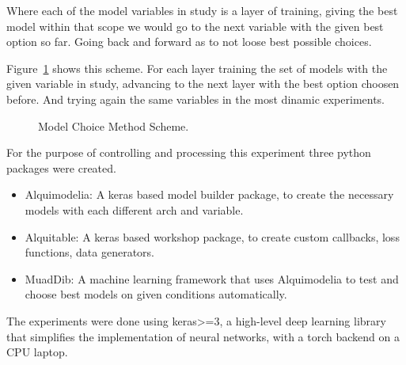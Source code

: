 Where each of the model variables in study is a layer of training, giving the best model within that scope we would go to the next variable with the given best option so far. Going back and forward as to not loose best possible choices.\par
Figure~\ref{fig:method_training} shows this scheme. For each layer training the set of models with the given variable in study, advancing to the next layer with the best option choosen before. And trying again the same variables in the most dinamic experiments.\par

\begin{figure}[H]
	\centering
	\resizebox{\linewidth}{!}{}
	\caption{Model Choice Method Scheme.}
	\label{fig:method_training}
\end{figure}

For the purpose of controlling and processing this experiment three python packages were created.

\begin{itemize}
    \item Alquimodelia: A keras based model builder package, to create the necessary models with each different arch and variable.
    \item Alquitable: A keras based workshop package, to create custom callbacks, loss functions, data generators.
    \item MuadDib: A machine learning framework that uses Alquimodelia to test and choose best models on given conditions automatically.
\end{itemize}

The experiments were done using keras>=3, a high-level deep learning library that simplifies the implementation of neural networks, with a torch backend on a CPU laptop.



